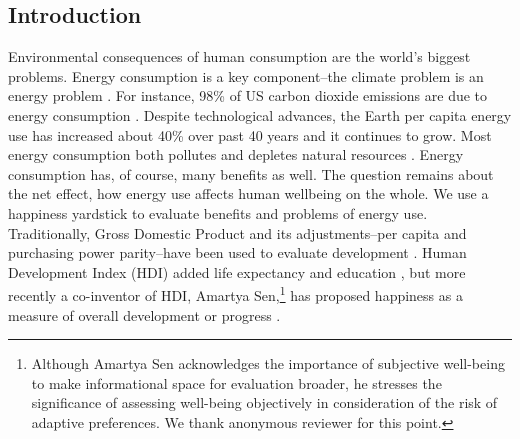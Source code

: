 \documentclass[10pt, letterpaper]{article}
\begin{document}
\vspace{.15in} 


\begin{spacing}{1.5}




\section*{\large \bf Introduction} %

Environmental consequences of human consumption are the world's biggest
problems.  Energy consumption is a key component--the climate problem is an
energy problem \citep{mackay08}. For instance, 98\% of US carbon dioxide emissions are due to
energy consumption \citep{eia08}. Despite
technological advances, the Earth per capita energy use has increased about 40\%
over past 40 years and it continues to grow. %
Most energy consumption both pollutes and  depletes natural resources
\citep{arrow04, soytas07}. %
 Energy consumption has, of course, many benefits as well.
 The question remains about the net effect, how energy use affects human
 wellbeing on the whole.
We use a happiness yardstick
to evaluate benefits and problems of energy use. Traditionally, Gross Domestic
Product and its adjustments--per capita and purchasing power parity--have been
used to evaluate development \citep{jorgenson14C}. Human Development Index (HDI)
added life expectancy and education \citep{steinberger10}, but more recently a
co-inventor of HDI, Amartya Sen,\footnote{Although
  Amartya Sen acknowledges the importance  of subjective well-being to make
  informational space for evaluation broader, he stresses the significance of
  assessing well-being objectively in consideration of the risk of adaptive
  preferences. We thank anonymous reviewer for this point.} has proposed happiness as a measure of overall development or progress  \citep{stiglitz09al}. 


\end{spacing}
\end{document}
